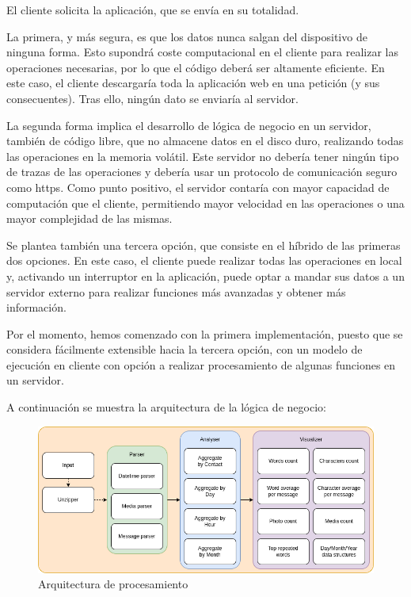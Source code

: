 El cliente solicita la aplicación, que se envía en su totalidad.

La primera, y más segura, es que los datos nunca salgan del dispositivo de ninguna forma. Esto supondrá coste computacional en el cliente para realizar las operaciones necesarias, por lo que el código deberá ser altamente eficiente. En este caso, el cliente descargaría toda la aplicación web en una petición (y sus consecuentes). Tras ello, ningún dato se enviaría al servidor.

La segunda forma implica el desarrollo de lógica de negocio en un servidor, también de código libre, que no almacene datos en el disco duro, realizando todas las operaciones en la memoria volátil. Este servidor no debería tener ningún tipo de trazas de las operaciones y debería usar un protocolo de comunicación seguro como \acrfull{https}. Como punto positivo, el servidor contaría con mayor capacidad de computación que el cliente, permitiendo mayor velocidad en las operaciones o una mayor complejidad de las mismas.

Se plantea también una tercera opción, que consiste en el híbrido de las primeras dos opciones. En este caso, el cliente puede realizar todas las operaciones en local y, activando un interruptor en la aplicación, puede optar a mandar sus datos a un servidor externo para realizar funciones más avanzadas y obtener más información.

Por el momento, hemos comenzado con la primera implementación, puesto que se considera fácilmente extensible hacia la tercera opción, con un modelo de ejecución en cliente con opción a realizar procesamiento de algunas funciones en un servidor.

A continuación se muestra la arquitectura de la lógica de negocio:

\begin{figure}[H]
	\centering
	\includegraphics[width=\textwidth]{img/architecture_processing.png}
	\caption{Arquitectura de procesamiento}
	\label{fig:chap4:architecture_processing}
\end{figure}

